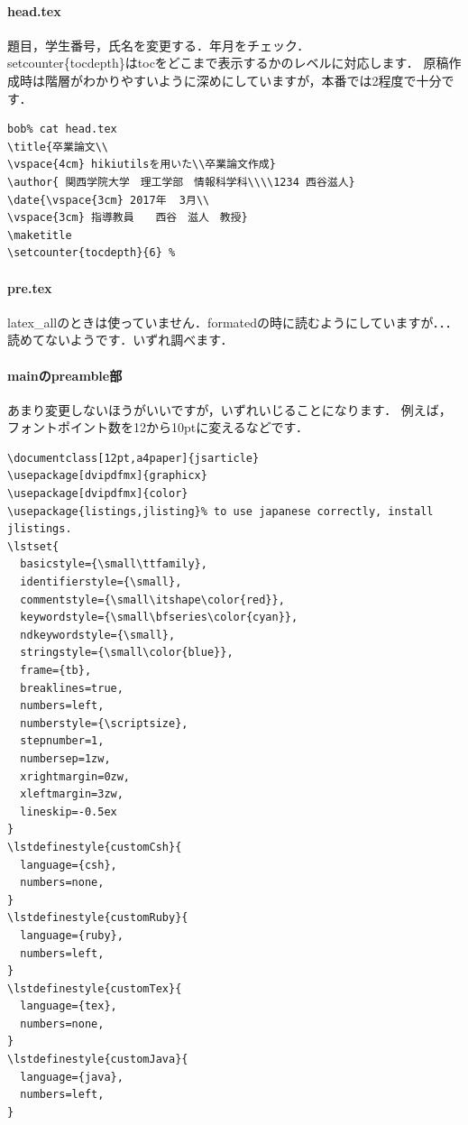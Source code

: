 \paragraph{head.tex}
題目，学生番号，氏名を変更する．年月をチェック．
\\setcounter\{tocdepth\}はtocをどこまで表示するかのレベルに対応します．
原稿作成時は階層がわかりやすいように深めにしていますが，本番では2程度で十分です．
\begin{lstlisting}[style=customTeX,basicstyle={\scriptsize\ttfamily}]
bob% cat head.tex
\title{卒業論文\\
\vspace{4cm} hikiutilsを用いた\\卒業論文作成}
\author{ 関西学院大学　理工学部　情報科学科\\\\1234 西谷滋人}
\date{\vspace{3cm} 2017年  3月\\
\vspace{3cm} 指導教員　　西谷　滋人　教授}
\maketitle
\setcounter{tocdepth}{6} %

\end{lstlisting}
\paragraph{pre.tex}
latex\_allのときは使っていません．formatedの時に読むようにしていますが．．．読めてないようです．いずれ調べます．

\paragraph{mainのpreamble部}
あまり変更しないほうがいいですが，いずれいじることになります．
例えば，フォントポイント数を12から10ptに変えるなどです．
\begin{lstlisting}[style=customTeX,basicstyle={\scriptsize\ttfamily}]
\documentclass[12pt,a4paper]{jsarticle}
\usepackage[dvipdfmx]{graphicx}
\usepackage[dvipdfmx]{color}
\usepackage{listings,jlisting}% to use japanese correctly, install jlistings.
\lstset{
  basicstyle={\small\ttfamily},
  identifierstyle={\small},
  commentstyle={\small\itshape\color{red}},
  keywordstyle={\small\bfseries\color{cyan}},
  ndkeywordstyle={\small},
  stringstyle={\small\color{blue}},
  frame={tb},
  breaklines=true,
  numbers=left,
  numberstyle={\scriptsize},
  stepnumber=1,
  numbersep=1zw,
  xrightmargin=0zw,
  xleftmargin=3zw,
  lineskip=-0.5ex
}
\lstdefinestyle{customCsh}{
  language={csh},
  numbers=none,
}
\lstdefinestyle{customRuby}{
  language={ruby},
  numbers=left,
}
\lstdefinestyle{customTex}{
  language={tex},
  numbers=none,
}
\lstdefinestyle{customJava}{
  language={java},
  numbers=left,
}

\end{lstlisting}
